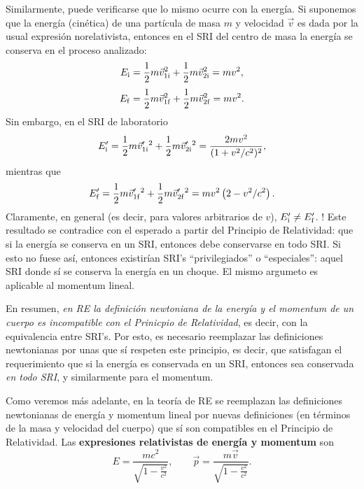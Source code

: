 Similarmente, puede verificarse que lo mismo ocurre con la energía. 
Si suponemos que la energía (cinética) de una partícula de masa $m$ y velocidad $\vec{v}$ es dada por la usual expresión norelativista, entonces en el SRI del centro de masa la energía se conserva en el proceso analizado:
\begin{equation}
 E_{\rm i}=\frac{1}{2}m\vec{v}_{1\rm i}^2+\frac{1}{2}m\vec{v}_{2\rm i}^2=mv^2,
\end{equation}
\begin{equation}
 E_{\rm f}=\frac{1}{2}m\vec{v}_{1\rm f}^2+\frac{1}{2}m\vec{v}_{2\rm f}^2=mv^2.
\end{equation}
Sin embargo, en el SRI de laboratorio
\begin{equation}
 E'_{\rm i}=\frac{1}{2}m\vec{v}'_{1\rm i}{}^2+\frac{1}{2}m\vec{v}'_{2\rm i}{}^2=\frac{2mv^2}{(1+v^2/c^2)^2},
\end{equation}
mientras que
\begin{equation}
 E'_{\rm f}=\frac{1}{2}m\vec{v}'_{1\rm f}{}^2+\frac{1}{2}m\vec{v}'_{2\rm f}{}^2=mv^2\left(2-v^2/c^2\right).
\end{equation}
Claramente, en general (es decir, para valores arbitrarios de $v$),  $ E'_{\rm i}\neq E'_{\rm f}$. ! Este resultado se contradice con el esperado a partir del Principio de Relatividad: que si la energía se conserva en un SRI, entonces debe conservarse en todo SRI. Si esto no fuese así, entonces existirían SRI's ``privilegiados'' o ``especiales'': aquel SRI donde sí se conserva la energía en un choque. El mismo argumeto es aplicable al momentum lineal.

En resumen, \textit{en RE la definición newtoniana de la energía y el momentum de un cuerpo es incompatible con el Prinicpio de Relatividad}, es decir, con la equivalencia entre SRI's. Por esto, es necesario reemplazar las definiciones newtonianas por unas que sí respeten este principio, es decir, que satisfagan el requerimiento que si la energía es conservada en un SRI, entonces sea conservada \textit{en todo SRI}, y similarmente para el momentum.

Como veremos más adelante, en la teoría de RE se reemplazan las definiciones newtonianas de energía y momentum lineal por nuevas definiciones (en términos de la masa y velocidad del cuerpo) que sí son compatibles en el Principio de Relatividad. Las \textbf{expresiones relativistas de energía y momentum} son
\begin{equation}
E=\frac{mc^2}{\sqrt{1-\frac{v^2}{c^2}}}, \qquad \vec{p}=\frac{m\vec{v}}{\sqrt{1-\frac{v^2}{c^2}}}.
\end{equation}

